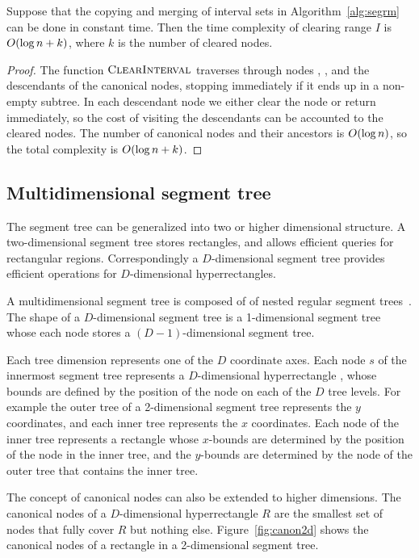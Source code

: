 \documentclass[english,gradu]{tktltiki2018}
\begin{document}
\begin{lem}\label{lem:segrmtime}Suppose that the copying and merging of interval sets in Algorithm~\ref{alg:segrm} can be done in constant time.
Then the time complexity of clearing range $I$ is $O(\log n + k)$, where $k$ is the number of cleared nodes.\end{lem}
\begin{proof}
The function $\textsc{ClearInterval}$ traverses through nodes , , and the descendants of the canonical nodes, stopping immediately if it ends up in a non-empty subtree.
In each descendant node we either clear the node or return immediately, so the cost of visiting the descendants can be accounted to the cleared nodes.
The number of canonical nodes and their ancestors is $O(\log n)$, so the total complexity is $O(\log n + k)$.
\end{proof}


\subsection{Multidimensional segment tree}

The segment tree can be generalized into two or higher dimensional structure.
A two-dimensional segment tree stores rectangles, and allows efficient queries for rectangular regions.
Correspondingly a $D$-dimensional segment tree provides efficient operations for $D$-dimensional hyperrectangles.

A multidimensional segment tree is composed of of nested regular segment trees~\cite{highseg}.
The shape of a $D$-dimensional segment tree is a 1-dimensional segment tree whose each node stores a $(D-1)$-dimensional segment tree.

Each tree dimension represents one of the $D$ coordinate axes.
Each node $s$ of the innermost segment tree represents a $D$-dimensional hyperrectangle , whose bounds are defined by the position of the node on each of the $D$ tree levels.
For example the outer tree of a 2-dimensional segment tree represents the $y$ coordinates, and each inner tree represents the $x$ coordinates.
Each node of the inner tree represents a rectangle whose $x$-bounds are determined by the position of the node in the inner tree, and the $y$-bounds are determined by the node of the outer tree that contains the inner tree.

The concept of canonical nodes can also be extended to higher dimensions.
The canonical nodes  of a $D$-dimensional hyperrectangle $R$ are the smallest set of nodes that fully cover $R$ but nothing else.
Figure~\ref{fig:canon2d} shows the canonical nodes of a rectangle in a 2-dimensional segment tree.
\end{document}
